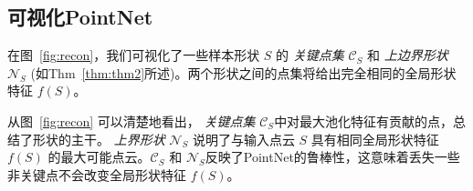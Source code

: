 \subsection{可视化PointNet}
\label{sec:visualizing_pointnet}

在图~\ref{fig:recon}，我们可视化了一些样本形状 $S$ 的 \textit{关键点集} $\mathcal{C}_S$ 和 \textit{上边界形状} $\mathcal{N}_S$ (如Thm~\ref{thm:thm2}所述)。两个形状之间的点集将给出完全相同的全局形状特征 $f(S)$。

从图~\ref{fig:recon} 可以清楚地看出， \textit{关键点集} $\mathcal{C}_S$中对最大池化特征有贡献的点，总结了形状的主干。
\textit{上界形状} $\mathcal{N}_S$ 说明了与输入点云 $S$ 具有相同全局形状特征 $f(S)$ 的最大可能点云。$\mathcal{C}_S$ 和 $\mathcal{N}_S$反映了PointNet的鲁棒性，这意味着丢失一些非关键点不会改变全局形状特征 $f(S)$。



